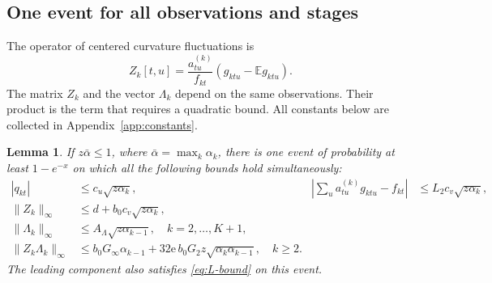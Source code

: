 \documentclass[11pt]{article}
\newcommand{\E}{\mathbb E}
\newcommand{\norm}[1]{\lVert#1\rVert}
\newtheorem{lemma}[theorem]{Lemma}
\theoremstyle{remark}
\begin{document}
\subsection{One event for all observations and stages}
The operator of centered curvature fluctuations is
\[
 Z_k[t,u]=\frac{a_{tu}^{(k)}}{f_{kt}}(g_{ktu}-\E g_{ktu}).
\]
The matrix \(Z_k\) and the vector \(\Lambda_k\) depend on the same
observations. Their product is the term that requires a quadratic bound.
All constants below are collected in Appendix~\ref{app:constants}.

\begin{lemma}\label{lem:event}
If \(z\bar\alpha\le1\), where \(\bar\alpha=\max_k\alpha_k\), there is
one event of probability at least \(1-e^{-x}\) on which all the following
bounds hold simultaneously:
\begin{align}
 |q_{kt}|&\le c_u\sqrt{z\alpha_k},&
 \left|\sum_u a_{tu}^{(k)}g_{ktu}-f_{kt}\right|
       &\le L_2c_v\sqrt{z\alpha_k},\label{eq:score-hess}\\
 \norm{Z_k}_\infty&\le d+b_0c_v\sqrt{z\alpha_k},\label{eq:Znorm}\\
 \norm{\Lambda_k}_\infty&\le A_\Lambda\sqrt{z\alpha_{k-1}},
       \quad k=2,\ldots,K+1,\label{eq:Lambda-bound}\\
 \norm{Z_k\Lambda_k}_\infty
   &\le b_0G_\infty\alpha_{k-1}
          +32\mathrm e\,b_0G_2 z\sqrt{\alpha_k\alpha_{k-1}},
          \quad k\ge2.\label{eq:ZLambda}
\end{align}
The leading component also satisfies \eqref{eq:L-bound} on this event.
\end{lemma}
\end{document}
